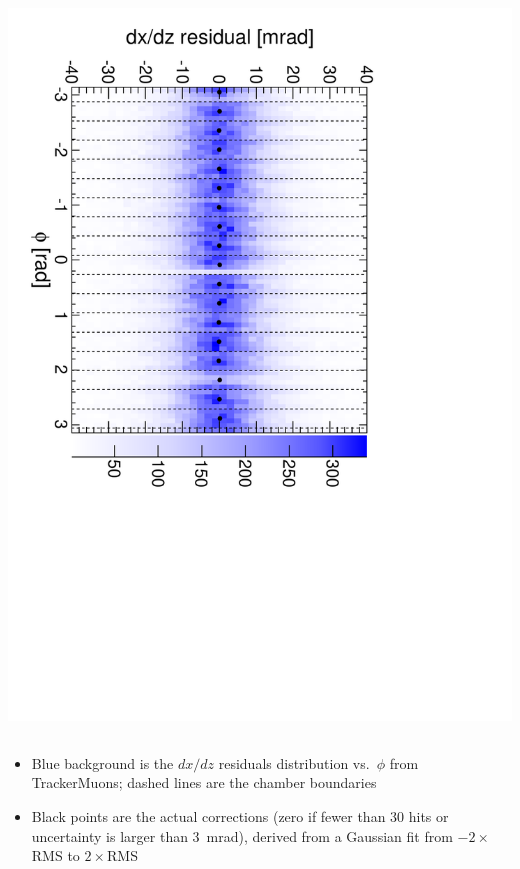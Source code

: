 \documentclass[compress]{beamer}
\begin{document}
\begin{frame}
\begin{columns}
\includegraphics[height=\linewidth, angle=90]{iter02_mep31.pdf}
\end{columns}

\begin{itemize}
\item Blue background is the $dx/dz$ residuals distribution
  vs.\ $\phi$ from TrackerMuons; dashed lines are the chamber boundaries
\item Black points are the actual corrections (zero if fewer than 30
  hits or uncertainty is larger than 3~mrad), derived from a Gaussian
  fit from $-2\times$RMS to $2\times$RMS
\end{itemize}
\end{frame}
\end{document}

